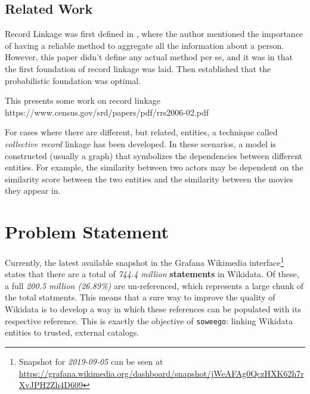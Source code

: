 \documentclass[epsfig,a4paper,11pt,titlepage,twoside,openany]{book}
\begin{document}
\section{Related Work}
\label{sec:rl-related-work}

Record Linkage was first defined in \cite{dunn46_recor_linkag}, where the author
mentioned the importance of having a reliable method to aggregate all the
information about a person. However, this paper didn't define any actual method
per se, and it was in \cite{newcombe59_autom_linkag_vital_recor} that the first
foundation of record linkage was laid. Then \cite{fellegi69_theor_recor_linkag}
established that the probabilistic foundation was optimal. 

This presents some work on record linkage
https://www.census.gov/srd/papers/pdf/rrs2006-02.pdf


For cases where there are different, but related, entities, a technique called \textit{collective record} \cite{Kalashnikov2006_collective_graph,Dong2005_reference_reconciliation,bhattacharya07_collec_entit_resol_relat_data} linkage has been developed. In these scenarios,  a model is constructed (usually a graph) that symbolizes the dependencies between  different entities. For example, the similarity between two actors may be dependent on the similarity score between the two entities and the similarity between the  movies they appear in.


\chapter{Problem Statement}
\label{chap:problem-statement}

Currently, the latest available snapshot in the Grafana Wikimedia interface\footnote{Snapshot for \textit{2019-09-05} can be seen at \url{https://grafana.wikimedia.org/dashboard/snapshot/jWeAFAg0QczHXK62h7rXvJPH2Zh4D609}} states that there are a total of \textit{744.4 million} \textbf{statements} in Wikidata. Of these, a full \textit{200.5 million (26.89\%)} are un-referenced, which represents a large chunk of the total statments. This means that a sure way to improve the quality of Wikidata is to develop a way in which these references can be populated with its respective reference. This is exactly the objective of \texttt{soweego}: linking Wikidata entities to trusted, external catalogs.
\end{document}
